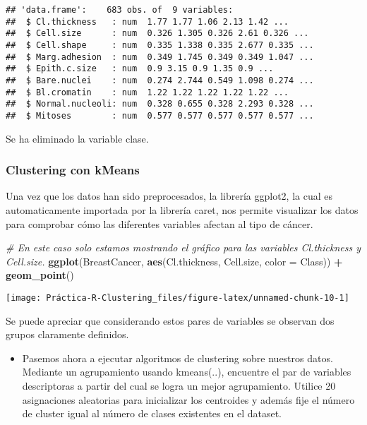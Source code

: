 \documentclass[]{article}
\newenvironment{Shaded}{\begin{snugshade}}{\end{snugshade}}
\newcommand{\CommentTok}[1]{\textcolor[rgb]{0.56,0.35,0.01}{\textit{#1}}}
\newcommand{\DataTypeTok}[1]{\textcolor[rgb]{0.13,0.29,0.53}{#1}}
\newcommand{\KeywordTok}[1]{\textcolor[rgb]{0.13,0.29,0.53}{\textbf{#1}}}
\newcommand{\NormalTok}[1]{#1}
\newcommand{\OperatorTok}[1]{\textcolor[rgb]{0.81,0.36,0.00}{\textbf{#1}}}
\newcommand{\StringTok}[1]{\textcolor[rgb]{0.31,0.60,0.02}{#1}}
\providecommand{\tightlist}{%
  \setlength{\itemsep}{0pt}\setlength{\parskip}{0pt}}
\begin{document}
\begin{verbatim}
## 'data.frame':    683 obs. of  9 variables:
##  $ Cl.thickness   : num  1.77 1.77 1.06 2.13 1.42 ...
##  $ Cell.size      : num  0.326 1.305 0.326 2.61 0.326 ...
##  $ Cell.shape     : num  0.335 1.338 0.335 2.677 0.335 ...
##  $ Marg.adhesion  : num  0.349 1.745 0.349 0.349 1.047 ...
##  $ Epith.c.size   : num  0.9 3.15 0.9 1.35 0.9 ...
##  $ Bare.nuclei    : num  0.274 2.744 0.549 1.098 0.274 ...
##  $ Bl.cromatin    : num  1.22 1.22 1.22 1.22 1.22 ...
##  $ Normal.nucleoli: num  0.328 0.655 0.328 2.293 0.328 ...
##  $ Mitoses        : num  0.577 0.577 0.577 0.577 0.577 ...
\end{verbatim}

Se ha eliminado la variable clase.

\hypertarget{clustering-con-kmeans}{%
\subsubsection{Clustering con kMeans}\label{clustering-con-kmeans}}

Una vez que los datos han sido preprocesados, la librería ggplot2, la
cual es automaticamente importada por la librería caret, nos permite
visualizar los datos para comprobar cómo las diferentes variables
afectan al tipo de cáncer.

\begin{Shaded}
\begin{Highlighting}[]
\CommentTok{# En este caso solo estamos mostrando el gráfico para las variables Cl.thickness y Cell.size.}
\KeywordTok{ggplot}\NormalTok{(BreastCancer, }\KeywordTok{aes}\NormalTok{(Cl.thickness, Cell.size, }\DataTypeTok{color =}\NormalTok{ Class)) }\OperatorTok{+}\StringTok{ }\KeywordTok{geom_point}\NormalTok{()}
\end{Highlighting}
\end{Shaded}

\begin{center}\texttt{[image: Práctica-R-Clustering\_files/figure-latex/unnamed-chunk-10-1]} \end{center}

Se puede apreciar que considerando estos pares de variables se observan
dos grupos claramente definidos.

\begin{itemize}
\tightlist
\item
  Pasemos ahora a ejecutar algoritmos de clustering sobre nuestros
  datos. Mediante un agrupamiento usando kmeans(..), encuentre el par de
  variables descriptoras a partir del cual se logra un mejor
  agrupamiento. Utilice 20 asignaciones aleatorias para inicializar los
  centroides y además fije el número de cluster igual al número de
  clases existentes en el dataset.
\end{itemize}
\end{document}
